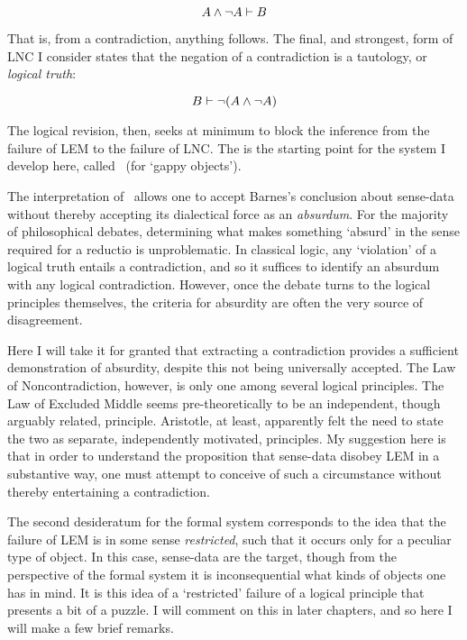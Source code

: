 \[{A\wedge\neg A}\vdash{B}\]

\noindent That is, from a contradiction, anything follows. The final, and strongest, form of LNC I consider states that the negation of a contradiction is a tautology, or \emph{logical truth}:

\[{B}\vdash{\neg(A\wedge\neg A)}\]

\noindent The logical revision, then, seeks at minimum to block the inference from the failure of LEM to the failure of LNC. The is the starting point for the system I develop here, called \GO\ (for `gappy objects').

The interpretation of \GO\ allows one to accept Barnes's conclusion about sense-data without thereby accepting its dialectical force as an \emph{absurdum}. For the majority of philosophical debates, determining what makes something `absurd' in the sense required for a reductio is unproblematic. In classical logic, any `violation' of a logical truth entails a contradiction, and so it suffices to identify an absurdum with any logical contradiction. However, once the debate turns to the logical principles themselves, the criteria for absurdity are often the very source of disagreement. 

Here I will take it for granted that extracting a contradiction provides a sufficient demonstration of absurdity, despite this not being universally accepted. The Law of Noncontradiction, however, is only one among several logical principles. The Law of Excluded Middle seems pre-theoretically to be an independent, though arguably related, principle. Aristotle, at least, apparently felt the need to state the two as separate, independently motivated, principles. My suggestion here is that in order to understand the proposition that sense-data disobey LEM in a substantive way, one must attempt to conceive of such a circumstance without thereby entertaining a contradiction.

The second desideratum for the formal system corresponds to the idea that the failure of LEM is in some sense \emph{restricted}, such that it occurs only for a peculiar type of object. In this case, sense-data are the target, though from the perspective of the formal system it is inconsequential what kinds of objects one has in mind. It is this idea of a `restricted' failure of a logical principle that presents a bit of a puzzle. I will comment on this in later chapters, and so here I will make a few brief remarks.

